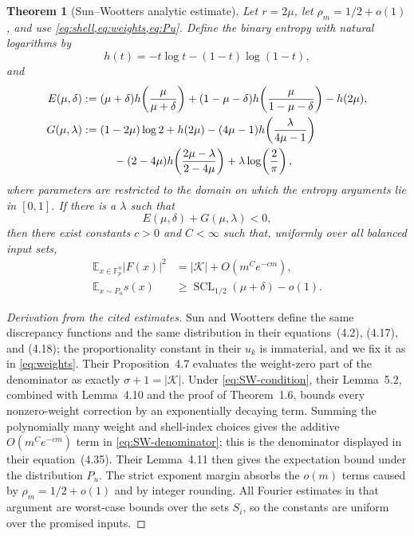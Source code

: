 \documentclass[11pt,letterpaper]{article}
\newtheorem{theorem}{Theorem}[section]
\theoremstyle{definition}
\newcommand{\F}{\mathbb{F}}
\newcommand{\Kcal}{\mathcal{K}}
\newcommand{\SCL}{\operatorname{SCL}}
\newcommand{\E}{\mathbb{E}}
\newcommand{\abs}[1]{\left\lvert #1\right\rvert}
\begin{document}
\begin{theorem}[Sun--Wootters analytic estimate]
\label{thm:SW-import}
Let $r=2\mu$, let $\rho_m=1/2+o(1)$, and use \cref{eq:shell,eq:weights,eq:Pu}.  Define the binary entropy with natural logarithms by
\[
   h(t)=-t\log t-(1-t)\log(1-t),
\]
and
\begin{align}
   E(\mu,\delta)
   &:=(\mu+\delta)h\!\left(\frac{\mu}{\mu+\delta}\right)
      +(1-\mu-\delta)h\!\left(\frac{\mu}{1-\mu-\delta}\right)
      -h(2\mu),
      \label{eq:E-exponent}\\
   G(\mu,\lambda)
   &:=(1-2\mu)\log2+h(2\mu)
      -(4\mu-1)h\!\left(\frac{\lambda}{4\mu-1}\right)\notag\\
   &\hspace{2.8em}
      -(2-4\mu)h\!\left(\frac{2\mu-\lambda}{2-4\mu}\right)
      +\lambda\log\!\left(\frac2\pi\right),
      \label{eq:G-exponent}
\end{align}
where parameters are restricted to the domain on which the entropy arguments lie in $[0,1]$.
If there is a $\lambda$ such that
\begin{equation}
   E(\mu,\delta)+G(\mu,\lambda)<0,
   \label{eq:SW-condition}
\end{equation}
then there exist constants $c>0$ and $C<\infty$ such that, uniformly over all balanced input sets,
\begin{align}
   \E_{x\in\F_p^n}\abs{F(x)}^2
      &=\abs{\Kcal}+O(m^Ce^{-cm}),
      \label{eq:SW-denominator}\\
   \E_{x\sim P_u}s(x)
      &\ge \SCL_{1/2}(\mu+\delta)-o(1).
      \label{eq:SW-score}
\end{align}
\end{theorem}

\begin{proof}[Derivation from the cited estimates]
Sun and Wootters define the same discrepancy functions and the same distribution in their equations~(4.2), (4.17), and (4.18); the proportionality constant in their $u_k$ is immaterial, and we fix it as in \cref{eq:weights}.  Their Proposition~4.7 evaluates the weight-zero part of the denominator as exactly $\sigma+1=\abs{\Kcal}$.  Under \cref{eq:SW-condition}, their Lemma~5.2, combined with Lemma~4.10 and the proof of Theorem~1.6, bounds every nonzero-weight correction by an exponentially decaying term.  Summing the polynomially many weight and shell-index choices gives the additive $O(m^Ce^{-cm})$ term in \cref{eq:SW-denominator}; this is the denominator displayed in their equation~(4.35).  Their Lemma~4.11 then gives the expectation bound under the distribution $P_u$.  The strict exponent margin absorbs the $o(m)$ terms caused by $\rho_m=1/2+o(1)$ and by integer rounding.  All Fourier estimates in that argument are worst-case bounds over the sets $S_i$, so the constants are uniform over the promised inputs.
\end{proof}
\end{document}
